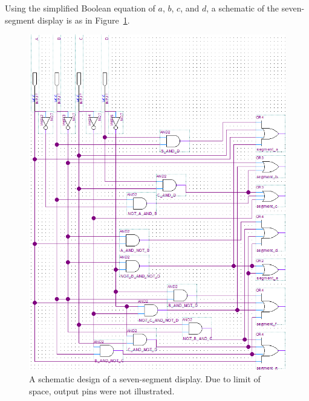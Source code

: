 \documentclass[12pt]{article}
\begin{document}
Using the simplified Boolean equation of $a$, $b$, $c$, and $d$, a schematic of the seven-segment display is as in Figure~\ref{figure:4}.

\begin{figure}
    \centering
    \includegraphics[width=\textwidth,height=\textheight,keepaspectratio]{seven_segment_display_schematic.png}
    \caption{A schematic design of a seven-segment display. Due to limit of space, output pins were not illustrated.}
    \label{figure:4}
\end{figure}
\end{document}
